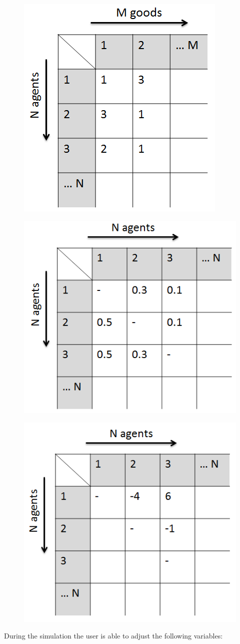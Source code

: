 \documentclass[twoside,openright]{uva-bachelor-thesis}
\begin{document}
\begin{figure}[h]
\centering
\begin{minipage}{.5\textwidth}
\centering
\includegraphics[width=.4\linewidth]{Matrices/Nominal_values}
\end{minipage}%
\begin{minipage}{.6\textwidth}
\centering
\includegraphics[width=.4\linewidth]{Matrices/Like_factors}
\label{fig:test2}
\end{minipage}
\begin{minipage}{.6\textwidth}
\centering
\includegraphics[width=.4\linewidth]{Matrices/Account_balance}
\label{fig:test3}
\end{minipage}
\end{figure}


During the simulation the user is able to adjust the following variables:
\end{document}
